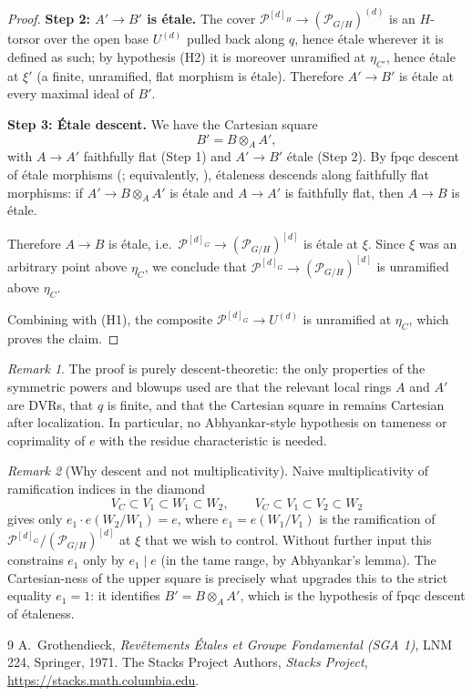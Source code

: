 \documentclass[12pt]{amsart}
\newcommand{\cP}{\mathcal{P}}
\theoremstyle{remark}
\newtheorem{rmk}{Remark}
\begin{document}
\begin{proof}
\textbf{Step 2: $A' \to B'$ is \'etale.}
The cover $\cP^{[d]_H} \to (\cP_{G/H})^{(d)}$ is an $H$-torsor over the open
base $U^{(d)}$ pulled back along $q$, hence \'etale wherever it is defined as
such; by hypothesis (H2) it is moreover unramified at $\eta_{C'}$, hence
\'etale at $\xi'$ (a finite, unramified, flat morphism is \'etale). Therefore
$A' \to B'$ is \'etale at every maximal ideal of $B'$.

\textbf{Step 3: \'Etale descent.}
We have the Cartesian square
\[
B' = B \otimes_A A',
\]
with $A \to A'$ faithfully flat (Step 1) and $A' \to B'$ \'etale (Step 2).
By fpqc descent of \'etale morphisms (\cite[\href{https://stacks.math.columbia.edu/tag/02L4}{Tag~02L4}]{stacks}; equivalently, \cite[Exp.~IX, Prop.~4.1]{SGA1}), \'etaleness descends along faithfully flat morphisms: if
$A' \to B \otimes_A A'$ is \'etale and $A \to A'$ is faithfully flat, then
$A \to B$ is \'etale.

Therefore $A \to B$ is \'etale, i.e.\ $\cP^{[d]_G} \to (\cP_{G/H})^{[d]}$ is
\'etale at $\xi$. Since $\xi$ was an arbitrary point above $\eta_C$, we
conclude that $\cP^{[d]_G} \to (\cP_{G/H})^{[d]}$ is unramified above
$\eta_C$.

Combining with (H1), the composite $\cP^{[d]_G} \to U^{(d)}$ is unramified
at $\eta_C$, which proves the claim.
\end{proof}

\begin{rmk}
The proof is purely descent-theoretic: the only properties of the symmetric
powers and blowups used are that the relevant local rings $A$ and $A'$ are
DVRs, that $q$ is finite, and that the Cartesian square in
 remains Cartesian after localization.
In particular, no Abhyankar-style hypothesis on tameness or coprimality of
$e$ with the residue characteristic is needed.
\end{rmk}

\begin{rmk}[Why descent and not multiplicativity]
Naive multiplicativity of ramification indices in the diamond
\[
V_C \subset V_1 \subset W_1 \subset W_2,\qquad V_C \subset V_1 \subset V_2 \subset W_2
\]
gives only $e_1 \cdot e(W_2/W_1) = e$, where $e_1 = e(W_1/V_1)$ is the
ramification of $\cP^{[d]_G}/(\cP_{G/H})^{[d]}$ at $\xi$ that we wish to
control. Without further input this constrains $e_1$ only by $e_1 \mid e$
(in the tame range, by Abhyankar's lemma). The Cartesian-ness of the upper
square is precisely what upgrades this to the strict equality $e_1 = 1$:
it identifies $B' = B \otimes_A A'$, which is the hypothesis of fpqc descent
of \'etaleness.
\end{rmk}

\begin{thebibliography}{9}
 A.~Grothendieck, \emph{Rev\^{e}tements \'Etales et Groupe
Fondamental (SGA 1)}, LNM 224, Springer, 1971.
 The Stacks Project Authors, \emph{Stacks Project},
\url{https://stacks.math.columbia.edu}.
\end{thebibliography}
\end{document}
